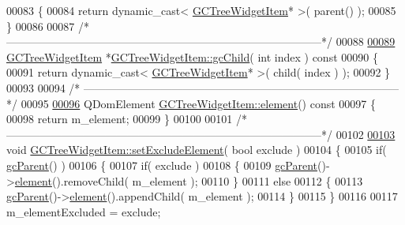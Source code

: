 \begin{DoxyCode}
00083 \textcolor{keyword}{}\{
00084   \textcolor{keywordflow}{return} \textcolor{keyword}{dynamic\_cast<} \hyperlink{class_g_c_tree_widget_item}{GCTreeWidgetItem}* \textcolor{keyword}{>}( parent() );
00085 \}
00086 
00087 \textcolor{comment}{/*
      --------------------------------------------------------------------------------------*/}
00088 
\hypertarget{gctreewidgetitem_8cpp_source_l00089}{}\hyperlink{class_g_c_tree_widget_item_af44c0d2c5eaa1c5bb3a6a1aace3e8c78}{00089} \hyperlink{class_g_c_tree_widget_item}{GCTreeWidgetItem} *\hyperlink{class_g_c_tree_widget_item_af44c0d2c5eaa1c5bb3a6a1aace3e8c78}{GCTreeWidgetItem::gcChild}( \textcolor{keywordtype}{int} index )\textcolor{keyword}{ const}
00090 \textcolor{keyword}{}\{
00091   \textcolor{keywordflow}{return} \textcolor{keyword}{dynamic\_cast<} \hyperlink{class_g_c_tree_widget_item}{GCTreeWidgetItem}* \textcolor{keyword}{>}( child( index ) );
00092 \}
00093 
00094 \textcolor{comment}{/*
      --------------------------------------------------------------------------------------*/}
00095 
\hypertarget{gctreewidgetitem_8cpp_source_l00096}{}\hyperlink{class_g_c_tree_widget_item_a584cad866bdbd94710d31eb77b804d84}{00096} QDomElement \hyperlink{class_g_c_tree_widget_item_a584cad866bdbd94710d31eb77b804d84}{GCTreeWidgetItem::element}()\textcolor{keyword}{ const}
00097 \textcolor{keyword}{}\{
00098   \textcolor{keywordflow}{return} m\_element;
00099 \}
00100 
00101 \textcolor{comment}{/*
      --------------------------------------------------------------------------------------*/}
00102 
\hypertarget{gctreewidgetitem_8cpp_source_l00103}{}\hyperlink{class_g_c_tree_widget_item_a4c1932884c3e7c0da8be9e2582e02f41}{00103} \textcolor{keywordtype}{void} \hyperlink{class_g_c_tree_widget_item_a4c1932884c3e7c0da8be9e2582e02f41}{GCTreeWidgetItem::setExcludeElement}( \textcolor{keywordtype}{bool} exclude )
00104 \{
00105   \textcolor{keywordflow}{if}( \hyperlink{class_g_c_tree_widget_item_a1125dbc55a8ba3e50662b8258cb35fdf}{gcParent}() )
00106   \{
00107     \textcolor{keywordflow}{if}( exclude )
00108     \{
00109       \hyperlink{class_g_c_tree_widget_item_a1125dbc55a8ba3e50662b8258cb35fdf}{gcParent}()->\hyperlink{class_g_c_tree_widget_item_a584cad866bdbd94710d31eb77b804d84}{element}().removeChild( m\_element );
00110     \}
00111     \textcolor{keywordflow}{else}
00112     \{
00113       \hyperlink{class_g_c_tree_widget_item_a1125dbc55a8ba3e50662b8258cb35fdf}{gcParent}()->\hyperlink{class_g_c_tree_widget_item_a584cad866bdbd94710d31eb77b804d84}{element}().appendChild( m\_element );
00114     \}
00115   \}
00116 
00117   m\_elementExcluded = exclude;

\end{DoxyCode}
